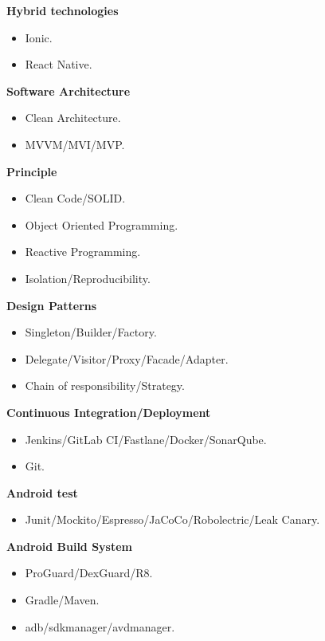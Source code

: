 \documentclass[10pt,a4paper,withhyper]{altacv}
\begin{document}
\begin{paracol}{2}
\textbf{Hybrid technologies}

\begin{itemize}
	\item Ionic.
	\item React Native.
\end{itemize}
\divider

\textbf{Software Architecture}

\begin{itemize}
	\item Clean Architecture.
	\item MVVM/MVI/MVP.
\end{itemize}
\divider

\textbf{Principle}

\begin{itemize}
	\item Clean Code/SOLID.
	\item Object Oriented Programming.
	\item Reactive Programming.
	\item Isolation/Reproducibility.
\end{itemize}
\divider

\textbf{Design Patterns}

\begin{itemize}
	\item Singleton/Builder/Factory.
	\item Delegate/Visitor/Proxy/Facade/Adapter.
	\item Chain of responsibility/Strategy.
\end{itemize}
\divider

\textbf{Continuous Integration/Deployment}

\begin{itemize}
	\item Jenkins/GitLab CI/Fastlane/Docker/SonarQube.
	\item Git.
\end{itemize}
\divider

\textbf{Android test}

\begin{itemize}
	\item Junit/Mockito/Espresso/JaCoCo/Robolectric/Leak Canary.
\end{itemize}
\divider

\textbf{Android Build System}

\begin{itemize}
	\item ProGuard/DexGuard/R8.
	\item Gradle/Maven.
	\item adb/sdkmanager/avdmanager.
\end{itemize}
\divider


\end{paracol}
\end{document}
